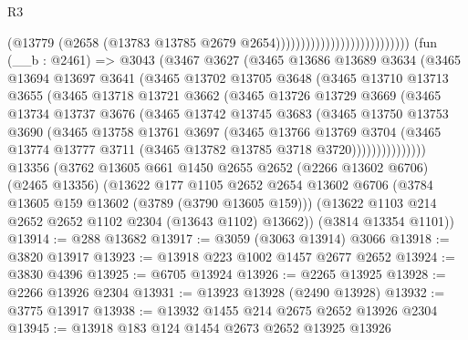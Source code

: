 \begin{lexlean}{R3}
\begin{coremodule}
                                                    (@13779
                                                      (@2658
                                                        (@13783
                                                          @13785
                                                          @2679
                                                          @2654)))))))))))))))))))))))))))
    (fun (__b : @2461) =>
    @3043
      (@3467
        @3627
        (@3465
          @13686
          @13689
          @3634
          (@3465
            @13694
            @13697
            @3641
            (@3465
              @13702
              @13705
              @3648
              (@3465
                @13710
                @13713
                @3655
                (@3465
                  @13718
                  @13721
                  @3662
                  (@3465
                    @13726
                    @13729
                    @3669
                    (@3465
                      @13734
                      @13737
                      @3676
                      (@3465
                        @13742
                        @13745
                        @3683
                        (@3465
                          @13750
                          @13753
                          @3690
                          (@3465
                            @13758
                            @13761
                            @3697
                            (@3465
                              @13766
                              @13769
                              @3704
                              (@3465
                                @13774
                                @13777
                                @3711
                                (@3465 @13782 @13785 @3718 @3720)))))))))))))))
    @13356
    (@3762
      @13605
      @661
      @1450
      @2655
      @2652
      (@2266 @13602 @6706)
      (@2465 @13356)
      (@13622
        @177
        @1105
        @2652
        @2654
        @13602
        @6706
        (@3784 @13605 @159 @13602 (@3789 (@3790 @13605 @159)))
        (@13622 @1103 @214 @2652 @2652 @1102 @2304 (@13643 @1102) @13662))
      (@3814 @13354 @1101))
@13914 := @288 @13682
@13917 := @3059 (@3063 @13914) @3066
@13918 := @3820 @13917
@13923 := @13918 @223 @1002 @1457 @2677 @2652
@13924 := @3830 @4396
@13925 := @6705 @13924
@13926 := @2265 @13925
@13928 := @2266 @13926 @2304
@13931 := @13923 @13928 (@2490 @13928)
@13932 := @3775 @13917
@13938 := @13932 @1455 @214 @2675 @2652 @13926 @2304
@13945 := @13918 @183 @124 @1454 @2673 @2652 @13925 @13926

\end{coremodule}
\end{lexlean}
